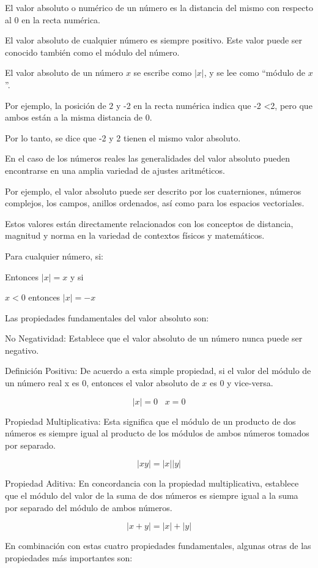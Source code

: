 \documentclass[oneside,spanish,letterpaper]{extbook}
\theoremstyle{mythmstyle}
\begin{document}
El valor absoluto o numérico de un número es la distancia del mismo con respecto al $0$ en la recta numérica.

El valor absoluto de cualquier número es siempre positivo. Este valor puede ser conocido también
como el módulo del número.

El valor absoluto de un número $x$ se escribe como $| x |$, y se lee como “módulo de $x$”.

Por ejemplo, la posición de $2$ y -2 en la recta numérica indica que -2 <2, pero que ambos están
a la misma distancia de 0.

Por lo tanto, se dice que -2 y 2 tienen el mismo valor absoluto.

En el caso de los números reales las generalidades del valor absoluto pueden encontrarse en una
amplia variedad de ajustes aritméticos.

Por ejemplo, el valor absoluto puede ser descrito por los cuaterniones, números complejos,
los campos, anillos ordenados, así como para los espacios vectoriales.

Estos valores están directamente relacionados con los conceptos de distancia, magnitud y
norma en la variedad de contextos físicos y matemáticos.

Para cualquier número, si:

  Entonces $| x | = x$  y  si

$x < 0$ entonces $| x | = -x$

Las propiedades fundamentales del valor absoluto son:

No Negatividad: Establece que el valor absoluto de un número nunca puede ser negativo.

Definición Positiva: De acuerdo a esta simple propiedad, si el valor del módulo de un número
real x es 0, entonces el valor absoluto de $x$ es 0 y vice-versa.

$$| x | = 0\;\;\; x = 0$$

Propiedad Multiplicativa: Esta significa que el módulo de un producto de dos números es siempre
igual al producto de los módulos de ambos números tomados por separado.

$$| xy| = | x | | y |$$

Propiedad Aditiva: En concordancia con la propiedad multiplicativa, establece que el módulo del
valor de la suma de dos números es siempre igual a la suma por separado del módulo de ambos números.

$$| x + y| = | x | + | y |$$

En combinación con estas cuatro propiedades fundamentales, algunas otras de las propiedades más
importantes son:
\end{document}

